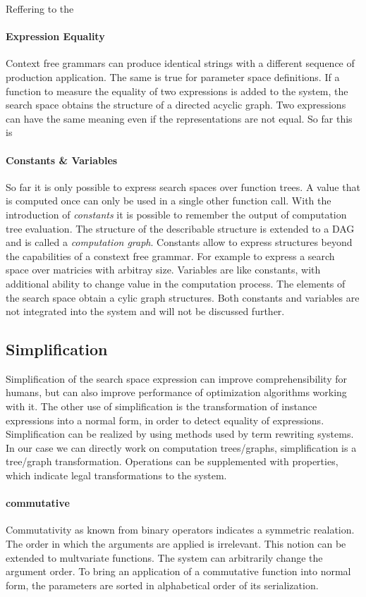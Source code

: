 \documentclass[english]{article}
\begin{document}
Reffering to the

\paragraph{Expression Equality}
Context free grammars can produce identical strings with a different sequence of production application. The same is true for parameter space definitions.
If a function to measure the equality of two expressions is added to the system, the search space obtains the structure of a directed acyclic graph.
Two expressions can have the same meaning even if the representations are not equal. So far this is

\paragraph{Constants \& Variables}
So far it is only possible to express search spaces over function trees.
A value that is computed once can only be used in a single other function call. With the introduction of \textit{constants} it is possible to remember the output of computation tree evaluation.
The structure of the describable structure is extended to a DAG and is called a \textit{computation graph}.
Constants allow to express structures beyond the capabilities of a constext free grammar. For example to express a search space over matricies with arbitray size.
Variables are like constants, with additional ability to change value in the computation process. The elements of the search space obtain a cylic graph structures.
Both constants and variables are not integrated into the system and will not be discussed further.

\subsection{Simplification}
Simplification of the search space expression can improve comprehensibility for humans, but can also improve performance of optimization algorithms working with it. The other use of simplification is the transformation of instance expressions into a normal form, in order to detect equality of expressions.
Simplification can be realized by using methods used by term rewriting systems. In our case we can directly work on computation trees/graphs,  simplification is a tree/graph transformation. Operations can be supplemented with properties, which indicate legal transformations to the system.

\paragraph{commutative} Commutativity as known from binary operators indicates a symmetric realation. The order in which the arguments are applied is irrelevant. This notion can be extended to multvariate functions. The system can arbitrarily change the argument order. To bring an application of a commutative function into normal form, the parameters are sorted in alphabetical order of its serialization.
\end{document}
